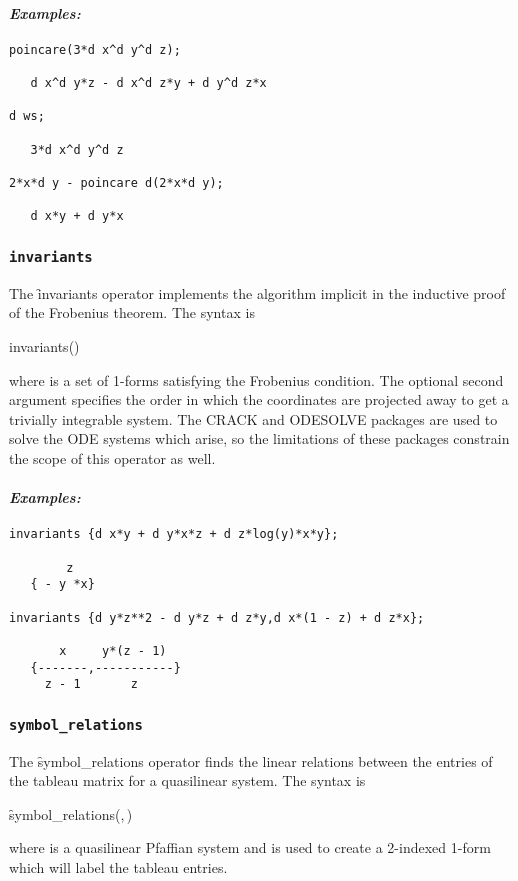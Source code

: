 \paragraph{\it Examples:}
\begin{verbatim}
poincare(3*d x^d y^d z);

   d x^d y*z - d x^d z*y + d y^d z*x 

d ws;

   3*d x^d y^d z

2*x*d y - poincare d(2*x*d y);

   d x*y + d y*x
\end{verbatim}


\subsubsection{\tt invariants}
\label{invariants}

The \f{invariants} operator implements the algorithm implicit in the
inductive proof of the Frobenius theorem. The syntax is
\begin{edssyntax}
	invariants()
\end{edssyntax}
where  is a set of 1-forms satisfying the Frobenius condition.
The optional second argument specifies the order in which the coordinates
are projected away to get a trivially integrable system.  The CRACK and
ODESOLVE packages are used to solve the ODE systems which arise, so the
limitations of these packages constrain the scope of this operator as well.

\paragraph{\it Examples:}
\begin{verbatim}
invariants {d x*y + d y*x*z + d z*log(y)*x*y};

        z
   { - y *x}

invariants {d y*z**2 - d y*z + d z*y,d x*(1 - z) + d z*x};

       x     y*(z - 1)
   {-------,-----------}
     z - 1       z
\end{verbatim}


\subsubsection{\tt symbol\_relations}
\label{symbol_relations}

The \f{symbol\_relations} operator finds the linear relations between the
entries of the tableau matrix for a quasilinear system. The syntax is
\begin{syntax}
  \f{symbol\_relations}(,\,)
\end{syntax}
where  is a quasilinear Pfaffian system and  is
used to create a 2-indexed 1-form which will label the tableau entries.

